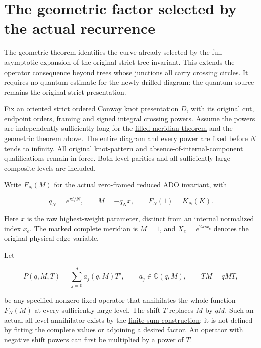 \section{The geometric factor selected by the actual recurrence}\label{gj:the-geometric-factor-selected-by-the-actual-recurrence}

The geometric theorem identifies the curve already selected by the
full asymptotic expansion of the original strict-tree invariant.
This extends the operator consequence beyond trees whose junctions
all carry crossing circles. It requires no quantum estimate for the
newly drilled diagram: the quantum source remains the original
strict presentation.

Fix an oriented strict ordered Conway knot presentation \(D\), with
its original cut, endpoint orders, framing and signed integral
crossing powers. Assume the powers are independently sufficiently
long for the \href{https://sashakolpakov.github.io/murakamis_dream/notes/actual_main_meridian_filled_volume.html}{filled-meridian theorem}
and the geometric theorem above. The entire diagram and every power
are fixed before \(N\) tends to infinity. All original knot-pattern
and absence-of-internal-component qualifications remain in force.
Both level parities and all sufficiently large composite levels are
included.

Write \(F_N(M)\) for the actual zero-framed reduced ADO invariant,
with

\begin{equation}\label{gj:O1}
q_N=e^{\pi i/N},\qquad M=-q_Nx,\qquad F_N(1)=K_N(K).
\end{equation}

Here \(x\) is the raw highest-weight parameter, distinct from an
internal normalized index \(x_e\). The marked complete meridian is
\(M=1\), and \(X_e=e^{2\pi ix_e}\) denotes the original physical-edge
variable.

Let

\begin{equation}\label{gj:O2}
P(q,M,T)=\sum_{j=0}^{d}a_j(q,M)T^j,\qquad
 a_j\in\mathbb C(q,M),\qquad TM=qMT,
\end{equation}

be any specified nonzero fixed operator that annihilates the whole
function \(F_N(M)\) at every sufficiently large level. The shift \(T\)
replaces \(M\) by \(qM\). Such an actual all-level annihilator exists
by the \href{https://sashakolpakov.github.io/murakamis_dream/notes/finite_sum_annihilator.html}{finite-sum construction}; it is not
defined by fitting the complete values or adjoining a desired factor.
An operator with negative shift powers can first be multiplied by
a power of \(T\).

